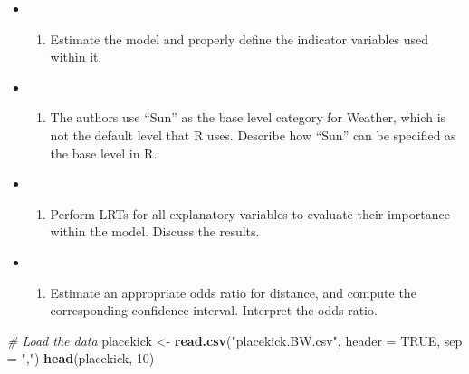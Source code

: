 \documentclass[]{article}
\newenvironment{Shaded}{\begin{snugshade}}{\end{snugshade}}
\newcommand{\CommentTok}[1]{\textcolor[rgb]{0.56,0.35,0.01}{\textit{#1}}}
\newcommand{\DataTypeTok}[1]{\textcolor[rgb]{0.13,0.29,0.53}{#1}}
\newcommand{\DecValTok}[1]{\textcolor[rgb]{0.00,0.00,0.81}{#1}}
\newcommand{\KeywordTok}[1]{\textcolor[rgb]{0.13,0.29,0.53}{\textbf{#1}}}
\newcommand{\NormalTok}[1]{#1}
\newcommand{\OtherTok}[1]{\textcolor[rgb]{0.56,0.35,0.01}{#1}}
\newcommand{\StringTok}[1]{\textcolor[rgb]{0.31,0.60,0.02}{#1}}
\providecommand{\tightlist}{%
  \setlength{\itemsep}{0pt}\setlength{\parskip}{0pt}}
\begin{document}
\begin{itemize}
\item
  \begin{enumerate}
  \def\labelenumi{(\alph{enumi})}
  \tightlist
  \item
    Estimate the model and properly deﬁne the indicator variables used
    within it.
  \end{enumerate}
\item
  \begin{enumerate}
  \def\labelenumi{(\alph{enumi})}
  \setcounter{enumi}{1}
  \tightlist
  \item
    The authors use ``Sun'' as the base level category for Weather,
    which is not the default level that R uses. Describe how ``Sun'' can
    be speciﬁed as the base level in R.
  \end{enumerate}
\item
  \begin{enumerate}
  \def\labelenumi{(\alph{enumi})}
  \setcounter{enumi}{2}
  \tightlist
  \item
    Perform LRTs for all explanatory variables to evaluate their
    importance within the model. Discuss the results.
  \end{enumerate}
\item
  \begin{enumerate}
  \def\labelenumi{(\alph{enumi})}
  \setcounter{enumi}{3}
  \tightlist
  \item
    Estimate an appropriate odds ratio for distance, and compute the
    corresponding conﬁdence interval. Interpret the odds ratio.
  \end{enumerate}
\end{itemize}

\begin{Shaded}
\begin{Highlighting}[]
\CommentTok{# Load the data}
\NormalTok{placekick <-}\StringTok{ }\KeywordTok{read.csv}\NormalTok{(}\StringTok{"placekick.BW.csv"}\NormalTok{, }\DataTypeTok{header =} \OtherTok{TRUE}\NormalTok{, }\DataTypeTok{sep =} \StringTok{","}\NormalTok{)}
\KeywordTok{head}\NormalTok{(placekick, }\DecValTok{10}\NormalTok{)}
\end{Highlighting}
\end{Shaded}
\end{document}
